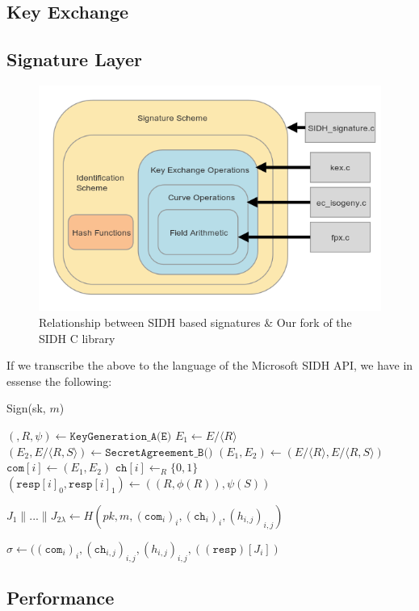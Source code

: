 \subsection{Key Exchange}


\subsection{Signature Layer}

\begin{figure}[htb]
\centering
\includegraphics[scale=0.7]{fullmapwcurve.png} %
\caption{Relationship between SIDH based signatures \& Our fork of the SIDH C library}
\label{fig:fullmap} %
\end{figure}


If we transcribe the above to the language of the Microsoft SIDH API, we have in essense the following:\\



\begin{algorithm}
\caption{Sign(sk, $m$)}\label{euclid}
\begin{algorithmic}[1]
	\State $(, R, \psi) \gets \texttt{KeyGeneration\_A(E)}$
	\State $E_{1} \gets E/\langle R \rangle$
	\State $(E_{2},E/\langle R,S \rangle) \gets \texttt{SecretAgreement\_B()}$
	\State $(E_{1},E_{2}) \gets (E/\langle R \rangle, E/\langle R,S \rangle)$
	\State $\texttt{com}[i] \gets (E_{1}, E_{2})$
	\State $\texttt{ch}[i] \gets_{R} \{0,1\}$
	\State $(\texttt{resp}[i]_{0}, \texttt{resp}[i]_{1}) \gets ((R,\phi(R)), \psi(S))$
	
\EndFor

\State $J_{1} \parallel ... \parallel J_{2\lambda} \gets H(pk, m, (\texttt{com}_{i})_{i},(\texttt{ch}_{i})_{i},(h_{i,j})_{i,j})$

\State \Return $\sigma \gets ((\texttt{com}_{i})_{i}, (\texttt{ch}_{i,j})_{i,j}, (h_{i,j})_{i,j}, ((\texttt{resp})[J_{i}])$
\end{algorithmic}
\end{algorithm}

\subsection{Performance}

